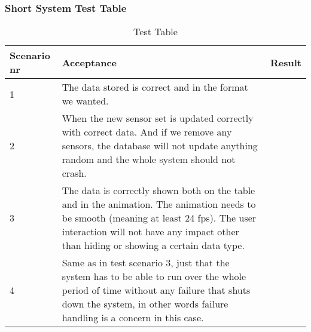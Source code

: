 \documentclass[../document]{subfiles}
\begin{document}
\subsubsection{Short System Test Table}
\begin{table}[H]
\caption{Test Table}
\centering
\begin{tabularx}{\textwidth}{|l|X|X|}
	\hline
	Scenario nr
	&Acceptance
	&Result
	\\ \hline 1
	&The data stored is correct and in the format we wanted.
	&
	\\ \hline 2
	&When the new sensor set is updated correctly with correct data. And if we remove any sensors, the database will not update anything random and the whole system should not crash.
	&
	\\ \hline 3
	&The data is correctly shown both on the table and in the animation. The animation needs to be smooth (meaning at least 24 fps). The user interaction will not have any impact other than hiding or showing a certain data type.
	&
	\\ \hline 4
	&Same as in test scenario 3, just that the system has to be able to run over the whole period of time without any failure that shuts down the system, in other words failure handling is a concern in this case.
	&
	\\ \hline 
\end{tabularx}
\end{table}
\end{document}
